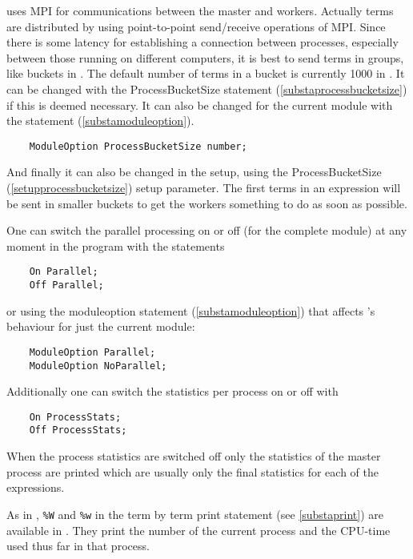 \ParFORM{} uses MPI for communications between the master and workers. 
Actually terms are distributed by using point-to-point send/receive 
operations of MPI. Since there is some latency for establishing a 
connection between processes, especially between those running on different 
computers, it is best to send terms in groups, like buckets in \TFORM{}. 
The default number of terms in a bucket is currently 1000 in \ParFORM{}. It 
can be changed with the ProcessBucketSize statement 
(\ref{substaprocessbucketsize}) if this is deemed 
necessary. It can also be changed for the current module with the statement 
(\ref{substamoduleoption}).
\begin{verbatim}
    ModuleOption ProcessBucketSize number;
\end{verbatim}
And finally it can also be changed in the setup, using the 
ProcessBucketSize (\ref{setupprocessbucketsize}) setup parameter.
The first terms in an expression will be sent in smaller buckets to get the 
workers something to do as soon as possible.

One can switch the parallel processing on or off (for the complete module) 
at any moment in the program with the statements%
\begin{verbatim}
    On Parallel;
    Off Parallel;
\end{verbatim}
or using the moduleoption statement (\ref{substamoduleoption}) that
affects \ParFORM{}'s behaviour for just the current module:
\begin{verbatim}
    ModuleOption Parallel;
    ModuleOption NoParallel;
\end{verbatim}
Additionally one can switch the statistics per process on or off with
\begin{verbatim}
    On ProcessStats;
    Off ProcessStats;
\end{verbatim}
When the process statistics 
are switched off only the statistics of the master process are printed 
which are usually only the final statistics for each of the expressions.

As in \TFORM{}, \verb:%W: and \verb:%w: in the term by term 
print statement (see \ref{substaprint}) are available in 
\ParFORM{}. They print the number of the current process and the 
CPU-time used thus far in that process.

